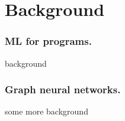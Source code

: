 \section{Background}
\label{sec:background}
\subsubsection{ML for programs.}
background 
\subsubsection{Graph neural networks.} 
some more background